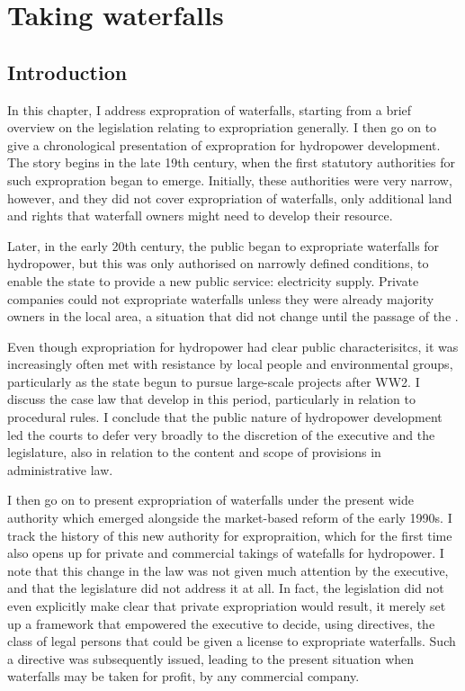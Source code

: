 \chapter{Taking waterfalls}\label{chap:4}

\section{Introduction}\label{sec:intro4}

In this chapter, I address expropration of waterfalls, starting from a brief overview on the legislation relating to expropriation generally. I then go on to give a chronological presentation of expropration for hydropower development. The story begins in the late 19th century, when the first statutory authorities for such expropration began to emerge. Initially, these authorities were very narrow, however, and they did not cover expropriation of waterfalls, only additional land and rights that waterfall owners might need to develop their resource. 

Later, in the early 20th century, the public began to expropriate waterfalls for hydropower, but this was only authorised on narrowly defined conditions, to enable the state to provide a new public service: electricity supply. Private companies could not expropriate  waterfalls unless they were already majority owners in the local area, a situation that did not change until the passage of the \cite{wra00}. 

Even though expropriation for hydropower had clear public characterisitcs, it was increasingly often met with resistance by local people and environmental groups, particularly as the state begun to pursue large-scale projects after WW2. I discuss the case law that develop in this period, particularly in relation to procedural rules. I conclude that the public nature of hydropower development led the courts to defer very broadly to the discretion of the executive and the legislature, also in relation to the content and scope of provisions in administrative law. 

I then go on to present expropriation of waterfalls under the present wide authority which emerged alongside the market-based reform of the early 1990s. I track the history of this new authority for expropraition, which for the first time also opens up for private and commercial takings of watefalls for hydropower. I note that this change in the law was not given much attention by the executive, and that the legislature did not address it at all. In fact, the legislation did not even explicitly make clear that private expropriation would result, it merely set up a framework that empowered the executive to decide, using directives, the class of legal persons that could be given a license to expropriate waterfalls. Such a directive was subsequently issued, leading to the present situation when waterfalls may be taken for profit, by any commercial company. 


